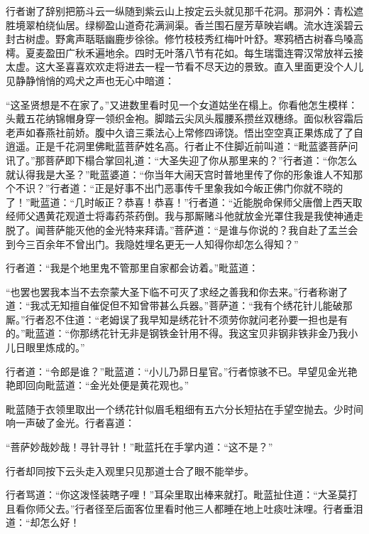 \documentclass[12pt,UTF8]{ctexbook}
\begin{document}
行者谢了辞别把筋斗云一纵随到紫云山上按定云头就见那千花洞。那洞外：青松遮胜境翠柏绕仙居。绿柳盈山道奇花满涧渠。香兰围石屋芳草映岩嵎。流水连溪碧云封古树虚。野禽声聒聒幽鹿步徐徐。修竹枝枝秀红梅叶叶舒。寒鸦栖古树春鸟嗓高樗。夏麦盈田广秋禾遍地余。四时无叶落八节有花如。每生瑞霭连霄汉常放祥云接太虚。这大圣喜喜欢欢走将进去一程一节看不尽天边的景致。直入里面更没个人儿见静静悄悄的鸡犬之声也无心中暗道：

“这圣贤想是不在家了。”又进数里看时见一个女道姑坐在榻上。你看他怎生模样：头戴五花纳锦帽身穿一领织金袍。脚踏云尖凤头履腰系攒丝双穗绦。面似秋容霜后老声如春燕社前娇。腹中久谙三乘法心上常修四谛饶。悟出空空真正果炼成了了自逍遥。正是千花洞里佛毗蓝菩萨姓名高。行者止不住脚近前叫道：“毗蓝婆菩萨问讯了。”那菩萨即下榻合掌回礼道：“大圣失迎了你从那里来的？”行者道：“你怎么就认得我是大圣？”毗蓝婆道：“你当年大闹天宫时普地里传了你的形象谁人不知那个不识？”行者道：“正是好事不出门恶事传千里象我如今皈正佛门你就不晓的了！”毗蓝道：“几时皈正？恭喜！恭喜！”行者道：“近能脱命保师父唐僧上西天取经师父遇黄花观道士将毒药茶药倒。我与那厮赌斗他就放金光罩住我是我使神通走脱了。闻菩萨能灭他的金光特来拜请。”菩萨道：“是谁与你说的？我自赴了盂兰会到今三百余年不曾出门。我隐姓埋名更无一人知得你却怎么得知？”

行者道：“我是个地里鬼不管那里自家都会访着。”毗蓝道：

“也罢也罢我本当不去奈蒙大圣下临不可灭了求经之善我和你去来。”行者称谢了道：“我忒无知擅自催促但不知曾带甚么兵器。”菩萨道：“我有个绣花针儿能破那厮。”行者忍不住道：“老姆误了我早知是绣花针不须劳你就问老孙要一担也是有的。”毗蓝道：“你那绣花针无非是钢铁金针用不得。我这宝贝非钢非铁非金乃我小儿日眼里炼成的。”

行者道：“令郎是谁？”毗蓝道：“小儿乃昴日星官。”行者惊骇不已。早望见金光艳艳即回向毗蓝道：“金光处便是黄花观也。”

毗蓝随于衣领里取出一个绣花针似眉毛粗细有五六分长短拈在手望空抛去。少时间响一声破了金光。行者喜道：

“菩萨妙哉妙哉！寻针寻针！”毗蓝托在手掌内道：“这不是？”

行者却同按下云头走入观里只见那道士合了眼不能举步。

行者骂道：“你这泼怪装瞎子哩！”耳朵里取出棒来就打。毗蓝扯住道：“大圣莫打且看你师父去。”行者径至后面客位里看时他三人都睡在地上吐痰吐沫哩。行者垂泪道：“却怎么好！
\end{document}
